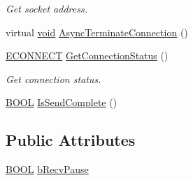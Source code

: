 \begin{DoxyCompactItemize}
\begin{DoxyCompactList}\small\item\em \-Get socket address. \end{DoxyCompactList}\item 
virtual \hyperlink{_cpclient_8h_a6464f7480a0fd0ee170cba12b2c0497f}{void} \hyperlink{class_c_p_connection_a703a63596b3e3c93a8b76238bf5ec6f4}{\-Async\-Terminate\-Connection} ()
\item 
\hyperlink{class_c_p_connection_a0b9dfdba3bf3fb022507756c5eff7bde}{\-E\-C\-O\-N\-N\-E\-C\-T} \hyperlink{class_c_p_connection_a72266989e31085bfb2f45f603115a6fb}{\-Get\-Connection\-Status} ()
\begin{DoxyCompactList}\small\item\em \-Get connection status. \end{DoxyCompactList}\item 
\hyperlink{_cpclient_8h_a3be13892ae7076009afcf121347dd319}{\-B\-O\-O\-L} \hyperlink{class_c_p_connection_ae1ccbe730072cfaa3d5ad7d94c9d6571}{\-Is\-Send\-Complete} ()
\end{DoxyCompactItemize}
\subsection*{\-Public \-Attributes}
\begin{DoxyCompactItemize}
\item 
\hyperlink{_cpclient_8h_a3be13892ae7076009afcf121347dd319}{\-B\-O\-O\-L} \hyperlink{class_c_p_connection_aafe1dacf5a3a4927f44435e887b5e177}{b\-Recv\-Pause}
\end{DoxyCompactItemize}
